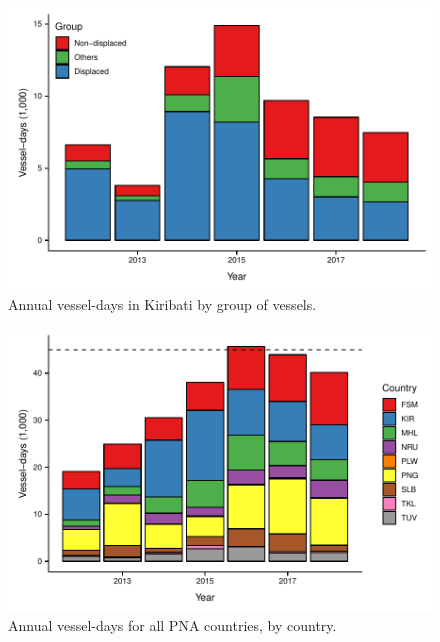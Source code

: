 \documentclass[9p,twocolumn,twoside,lineno]{pnas-new}
\begin{document}
\begin{figure}
\centering
\includegraphics{img/all_PS_VDS_KIR_year.pdf}
\caption{\label{fig:all_PS_VDS_KIR_year}Annual vessel-days in Kiribati by group of vessels.}
\end{figure}

\begin{figure}
\centering
	\includegraphics{img/all_PS_VDS_cty_year.pdf}
	\caption{\label{fig:all_PS_VDS_cty_year}Annual vessel-days for all PNA countries, by country.}
\end{figure}
\end{document}
